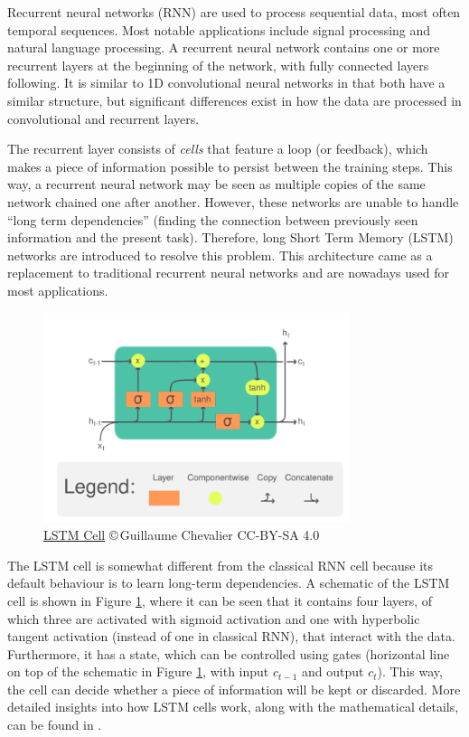 Recurrent neural networks (RNN) are used to process sequential data, most often temporal sequences. Most notable applications include signal processing and natural language processing. A recurrent neural network contains one or more recurrent layers at the beginning of the network, with fully connected layers following. It is similar to 1D convolutional neural networks in that both have a similar structure, but significant differences exist in how the data are processed in convolutional and recurrent layers.

The recurrent layer consists of \emph{cells} that feature a loop (or feedback), which makes a piece of information possible to persist between the training steps. This way, a recurrent neural network may be seen as multiple copies of the same network chained one after another. However, these networks are unable to handle ``long term dependencies'' \cite{Bengio1994} (finding the connection between previously seen information and the present task). Therefore, long Short Term Memory (LSTM) networks are introduced \cite{Hochreiter1997} to resolve this problem. This architecture came as a replacement to traditional recurrent neural networks and are nowadays used for most applications.

\begin{figure}
    \centering
    \includegraphics[width=0.8\textwidth]{slike/LSTM_Cell.pdf}
    \caption[LSTM Cell]{\href{https://commons.wikimedia.org/wiki/File:LSTM_Cell.svg}{LSTM Cell} \copyright\,Guillaume Chevalier CC-BY-SA 4.0}
    \label{fig:LSTMCell}
\end{figure}

The LSTM cell is somewhat different from the classical RNN cell because its default behaviour is to learn long-term dependencies. A schematic of the LSTM cell is shown in Figure \ref{fig:LSTMCell}, where it can be seen that it contains four layers, of which three are activated with sigmoid activation and one with hyperbolic tangent activation (instead of one in classical RNN), that interact with the data. Furthermore, it has a state, which can be controlled using gates (horizontal line on top of the schematic in Figure \ref{fig:LSTMCell}, with input $c_{t-1}$ and output $c_t$). This way, the cell can decide whether a piece of information will be kept or discarded. More detailed insights into how LSTM cells work, along with the mathematical details, can be found in \cite{Olah2015}.

